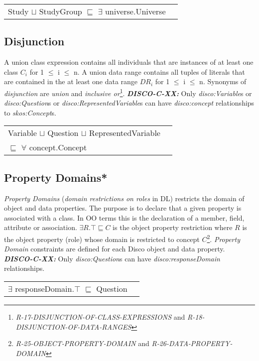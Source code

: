 \documentclass{elsart3p}    %
\newenvironment{DL}{
  \vspace{0cm}
  \begin{tabular}{l l}

}{
  \end{tabular}
}
\begin{document}
\begin{DL}
Study $\sqcup$ StudyGroup $\sqsubseteq$ $\exists$ universe.Universe \\
\end{DL}

\subsection{Disjunction}

A union class expression contains all individuals that are instances of at least one class $C_{i}$ for 1 $\leq$ i $\leq$ n. 
A union data range contains all tuples of literals that are contained in the at least one data range $DR_{i}$ for 1 $\leq$ i $\leq$ n.
Synonyms of {\em disjunction} are {\em union} and {\em inclusive or}\footnote{{\em R-17-DISJUNCTION-OF-CLASS-EXPRESSIONS} and {\em R-18-DISJUNCTION-OF-DATA-RANGES}}.
\textbf{{\em DISCO-C-XX:}} 
Only {\em disco:Variable}s or {\em disco:Question}s or {\em disco:RepresentedVariable}s can have {\em disco:concept} relationships to {\em skos:Concept}s.

\begin{DL}
Variable $\sqcup$ Question $\sqcup$ RepresentedVariable \\
$\sqsubseteq$ $\forall$ concept.Concept \\
\end{DL}
		
\subsection{Property Domains*}

{\em Property Domains} ({\em domain restrictions on roles} in DL) restricts the domain of object and data properties.
The purpose is to declare that a given property is associated with a class. 
In OO terms this is the declaration of a member, field, attribute or association. 
$\exists R. \top \sqsubseteq C$ is the object property restriction where $R$ is the object property (role) whose domain is restricted to concept $C$\footnote{{\em R-25-OBJECT-PROPERTY-DOMAIN} and {\em R-26-DATA-PROPERTY-DOMAIN}}.
{\em Property Domain} constraints are defined for each Disco object and data property.
\textbf{{\em DISCO-C-XX:}} 
Only {\em disco:Question}s can have {\em disco:responseDomain} relationships.

\begin{DL}
$\exists$ responseDomain.$\top$ $\sqsubseteq$ Question 
\end{DL}
\end{document}
